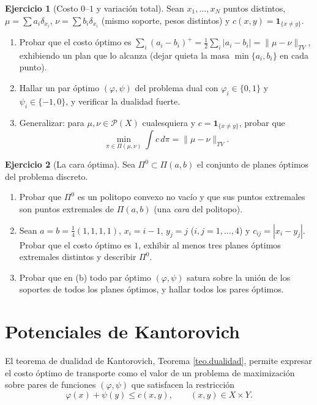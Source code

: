 \documentclass[12pt, a4paper]{amsbook}
\newcommand{\I}{{\mathbf 1}}
\theoremstyle{remark}
\theoremstyle{definition}
\newtheorem{ejercicio}{Ejercicio}[chapter]
\numberwithin{section}{chapter}
\numberwithin{subsection}{section}
\numberwithin{equation}{section}
\numberwithin{figure}{chapter}
\begin{document}
\begin{ejercicio}[Costo $0$--$1$ y variación total]\label{ejer.discreto.01}
Sean $x_1,\dots,x_N$ puntos distintos, $\mu=\sum a_i\delta_{x_i}$,
$\nu=\sum b_i\delta_{x_i}$ (mismo soporte, pesos distintos) y
$c(x,y)=\I_{\{x\ne y\}}$.
\begin{enumerate}[label=(\alph*)]
\item Probar que el costo óptimo es
$\sum_i(a_i-b_i)^+=\tfrac12\sum_i|a_i-b_i|=\|\mu-\nu\|_{TV}$, exhibiendo un
plan que lo alcanza (dejar quieta la masa $\min\{a_i,b_i\}$ en cada punto).
\item Hallar un par óptimo $(\varphi,\psi)$ del problema dual con
$\varphi_i\in\{0,1\}$ y $\psi_i\in\{-1,0\}$, y verificar la dualidad fuerte.
\item Generalizar: para $\mu,\nu\in\mathcal P(X)$ cualesquiera y
$c=\I_{\{x\ne y\}}$, probar que
\[
\min_{\pi\in\Pi(\mu,\nu)}\int c\,d\pi=\|\mu-\nu\|_{TV}.
\]
\end{enumerate}
\end{ejercicio}

\begin{ejercicio}[La cara óptima]\label{ejer.discreto.cara}
Sea $\Pi^0\subset\Pi(a,b)$ el conjunto de planes óptimos del problema
discreto.
\begin{enumerate}[label=(\alph*)]
\item Probar que $\Pi^0$ es un politopo convexo no vacío y que sus puntos
extremales son puntos extremales de $\Pi(a,b)$ (una \emph{cara} del
politopo).
\item Sean $a=b=\frac14(1,1,1,1)$, $x_i=i-1$, $y_j=j$ ($i,j=1,\dots,4$) y
$c_{ij}=|x_i-y_j|$. Probar que el costo óptimo es $1$, exhibir al menos tres
planes óptimos extremales distintos y describir $\Pi^0$.
\item Probar que en (b) todo par óptimo $(\varphi,\psi)$ satura sobre la
unión de los soportes de todos los planes óptimos, y hallar todos los pares
óptimos.
\end{enumerate}
\end{ejercicio}

\chapter{Potenciales de Kantorovich}\label{cap.dual}

El teorema de dualidad de Kantorovich, Teorema \ref{teo.dualidad}, permite
expresar el costo óptimo de transporte como el valor de un problema de
maximización sobre pares de funciones
\(
(\varphi,\psi)
\)
que satisfacen la restricción
\[
\varphi(x)+\psi(y)\le c(x,y),
\qquad
(x,y)\in X\times Y.
\]
\end{document}
